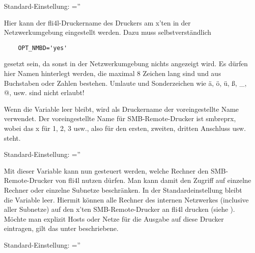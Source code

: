 \begin{description}
    Standard-Einstellung: =''



    Hier kann der fli4l-Druckername des Druckers am x'ten 
    in der Netzwerkumgebung eingestellt werden. Dazu muss selbstverständlich

\begin{example}
\begin{verbatim}
    OPT_NMBD='yes'
\end{verbatim}
\end{example}

    gesetzt sein, da sonst in der Netzwerkumgebung nichts angezeigt wird.
    Es dürfen hier Namen hinterlegt werden, die maximal 8 Zeichen lang sind und
    aus Buchstaben oder Zahlen bestehen. Umlaute und Sonderzeichen wie ä, ö, ü,
    ß, \_, @, usw. sind nicht erlaubt!

    Wenn die Variable leer bleibt, wird als Druckername der voreingestellte Name
    verwendet. Der voreingestellte Name für SMB-Remote-Drucker ist smbreprx,
    wobei das x für 1, 2, 3 usw., also für den ersten, zweiten, dritten
    Anschluss usw. steht.

    Standard-Einstellung: =''



    Mit dieser Variable kann nun gesteuert werden, welche Rechner den
    SMB-Remote-Drucker von fli4l nutzen dürfen. Man kann damit den Zugriff auf
    einzelne Rechner oder einzelne Subnetze beschränken. In der
    Standardeinstellung bleibt die Variable leer. Hiermit können alle Rechner
    des internen Netzwerkes (inclusive aller Subnetze) auf den x'ten
    SMB-Remote-Drucker an fli4l drucken (siehe ).
    Möchte man explizit Hosts oder Netze für die Ausgabe auf diese Drucker
    eintragen, gilt das unter  beschriebene.

    Standard-Einstellung: =''

\end{description}

